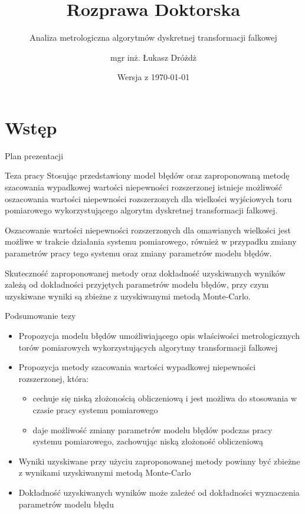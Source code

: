 \documentclass[12pt, polish, aspectratio = 169]{beamer}
\title{Rozprawa Doktorska}
\author{mgr inż. Łukasz Dróżdż}
\subtitle{Analiza metrologiczna algorytmów dyskretnej transformacji falkowej}
\institute{Politechnika Śląska, Wydział Elektryczny \\ Katedra Metrologii, Elektroniki i Automatyki}
\date{Wersja \gitVer{} z \today{}}
\begin{document}
\section*{Wstęp}

\begin{frame}[plain]
\titlepage
\end{frame}

\begin{frame}{Plan prezentacji}
\tableofcontents
\end{frame}


\begin{frame}{Teza pracy}
\justifying
Stosując przedstawiony model błędów oraz zaproponowaną metodę szacowania wypadkowej wartości niepewności rozszerzonej istnieje możliwość oszacowania wartości niepewności rozszerzonych dla wielkości wyjściowych toru pomiarowego wykorzystującego algorytm dyskretnej transformacji falkowej.

Oszacowanie wartości niepewności rozszerzonych dla omawianych wielkości jest możliwe w trakcie działania systemu pomiarowego, również w przypadku zmiany parametrów pracy tego systemu oraz zmiany parametrów modelu błędów.

Skuteczność zaproponowanej metody oraz dokładność uzyskiwanych wyników zależą od dokładności przyjętych parametrów modelu błędów, przy czym uzyskiwane wyniki są zbieżne z uzyskiwanymi metodą Monte-Carlo.
\end{frame}

\begin{frame}{Podsumowanie tezy}
\begin{itemize}
\item Propozycja modelu błędów umożliwiającego opis właściwości metrologicznych torów pomiarowych wykorzystujących algorytmy transformacji falkowej
\item Propozycja metody szacowania wartości wypadkowej niepewności rozszerzonej, która:
	\begin{itemize}
	\item cechuje się niską złożonością obliczeniową i jest możliwa do stosowania w czasie pracy systemu pomiarowego
	\item daje możliwość zmiany parametrów modelu błędów podczas pracy systemu pomiarowego, zachowując niską złożoność obliczeniową
	\end{itemize}
\item Wyniki uzyskiwane przy użyciu zaproponowanej metody powinny być zbieżne z wynikami uzyskiwanymi metodą Monte-Carlo
\item Dokładność uzyskiwanych wyników może zależeć od dokładności wyznaczenia parametrów modelu błędu
\end{itemize}
\end{frame}
\end{document}
